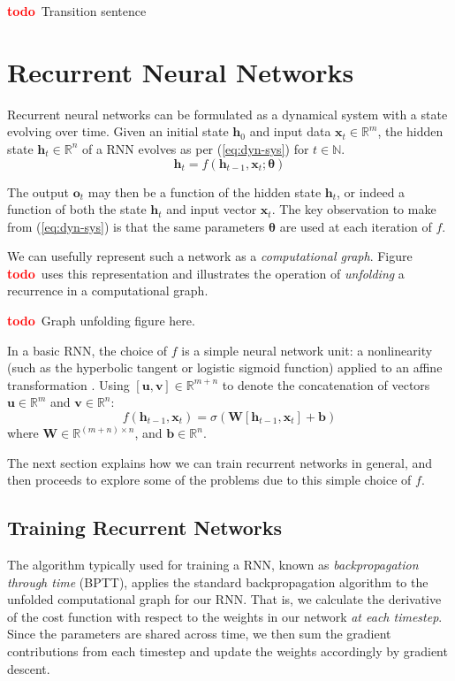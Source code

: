 \documentclass[12pt,a4paper,twoside,openright]{report}
\newcommand{\vect}[1]{\boldsymbol{\mathbf{#1}}}
\newcommand{\todo}{\textcolor{red}{\textbf{todo}~}}
\begin{document}
\todo Transition sentence

\section{Recurrent Neural Networks}\label{sec:rnn-intro}

Recurrent neural networks can be formulated as a dynamical system with a state
evolving over time. Given an initial state $\vect{h}_0$ and input data
$\vect{x}_t \in \mathbb{R}^m$, the hidden state $\vect{h}_t \in \mathbb{R}^n$ of
a RNN evolves as per (\ref{eq:dyn-sys}) for $t \in \mathbb{N}$.
\begin{equation}
  \vect{h}_t = f(\vect{h}_{t-1}, \vect{x}_t; \vect{\theta})
  \label{eq:dyn-sys}
\end{equation} 

The output
$\vect{o}_t$ may then be a function of the hidden state $\vect{h}_t$, or indeed
a function of both the state $\vect{h}_t$ and input vector $\vect{x}_t$. The key
observation to make from (\ref{eq:dyn-sys}) is that the same parameters
$\vect{\theta}$ are used at each iteration of $f$. 

We can usefully represent such a network as a \emph{computational graph}. Figure
\todo uses this representation and illustrates the operation of
\emph{unfolding} a recurrence in a computational graph.

\todo Graph unfolding figure here.

In a basic RNN, the choice of $f$ is a simple neural network unit: a
nonlinearity (such as the hyperbolic tangent or logistic sigmoid function)
applied to an affine transformation \cite{zaremba2014recurrent}. Using
$[\vect{u},\vect{v}] \in \mathbb{R}^{m+n}$ to denote the concatenation of
vectors $\vect{u} \in \mathbb{R}^m$ and $\vect{v} \in \mathbb{R}^n$: 
$$f(\vect{h}_{t-1}, \vect{x}_t) = \sigma(\vect{W}[\vect{h}_{t-1}, 
\vect{x}_t] + \vect{b})$$ 
where $\vect{W} \in \mathbb{R}^{(m+n) \times n}$, and $\vect{b} \in
\mathbb{R}^n$. 

The next section explains how we can train recurrent networks in general, and
then proceeds to explore some of the problems due to this simple choice of $f$.

\subsection{Training Recurrent Networks}\label{sec:rnn-train}

The algorithm typically used for training a RNN, known as \emph{backpropagation
through time} (BPTT), applies the standard backpropagation algorithm to the
unfolded computational graph for our RNN. That is, we calculate the derivative
of the cost function with respect to the weights in our network \emph{at each
timestep}. Since the parameters are shared across time, we then sum the gradient
contributions from each timestep and update the weights accordingly by gradient
descent.
\end{document}
